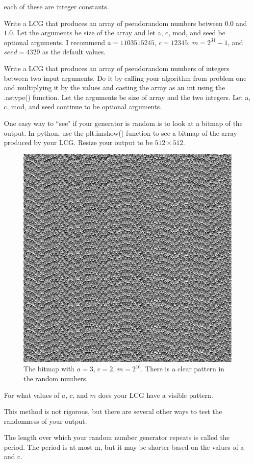 each of these are integer constants.

\begin{problem}
Write a LCG that produces an array of pseudorandom numbers between $0.0$ and $1.0$.
Let the arguments be size of the array and let a, c, mod, and seed be optional arguments.
I recommend $a=1103515245$, $c=12345$, $m=2^{31}-1$, and $seed=4329$ as the default values.
\end{problem}

\begin{problem}
Write a LCG that produces an array of pseudorandom numbers of integers between two input arguments.
Do it by calling your algorithm from problem one and multiplying it by the values and casting the array as an int using the .astype() function.
Let the arguments be size of array and the two integers.
Let a, c, mod, and seed continue to be optional arguments.
\end{problem}

One easy way to ``see" if your generator is random is to look at a bitmap of the output.
In python, use the plt.imshow() function to see a bitmap of the array produced by your LCG.
Resize your output to be $512 \times 512$.

\begin{figure}
\includegraphics[width=.4\textwidth]{PRNG1.png}
\caption{
The bitmap with $a=3$, $c=2$, $m=2^{16}$.
There is a clear pattern in the random numbers.}
\end{figure}

\begin{problem}
For what values of $a$, $c$, and $m$ does your LCG have a visible pattern.
\end{problem}

This method is not rigorous, but there are several other ways to test the randomness of your output.

The length over which your random number generator repeats is called the period.
The period is at most m, but it may be shorter based on the values of a and c.
 
